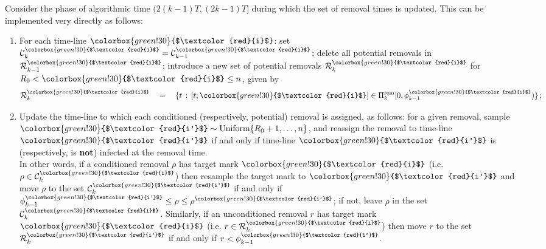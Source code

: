 \documentclass[]{article}
\newcommand{\Conditioned}{\mathcal{C}}
\newcommand{\Removals}{\mathcal{R}}
\newcommand{\Poisson}{\Pi}
\newcommand{\PoissonRem}{\Poisson^\textup{rem}}
\newcommand{\target}{{\colorbox{green!30}{$\textcolor{red}{i}$}}}
\newcommand{\targetm}{{\colorbox{green!30}{$\textcolor{red}{i'}$}}}
\begin{document}
\begin{lem}\label{lem:removal1}
Consider the phase of algorithmic time  \((2(k{-}1)T, (2k{-}1)T]\) during
which the set of removal times is updated.
This can be implemented very directly as follows:%
\begin{enumerate}
\item\label{item:removals-v2} For each time-line \(\target\): set \(\Conditioned^\target_k = \Conditioned^\target_{k-1}\);
delete all potential removals in \(\Removals^\target_{k-1}\); 
introduce a new set of potential removals \(\Removals^\target_k\) for \(R_0< \target\le n\), given by
\[
	\Removals^\target_k \quad=\quad \{t\,:\,[t;\target] \in \PoissonRem_k[0,\phi^\target_{k-1}) \} \,;
\]
\item\label{item:re-mark-removals-v2}
Update the time-line to which each conditioned (respectively, potential) removal is assigned, as follows:
for a given removal, sample \(\targetm\sim \textrm{Uniform}\{R_0+1,\dots,n\}\), 
and reassign the removal to time-line \(\targetm\) 
if and only if time-line \(\targetm\) is (respectively, is \textbf{not}) infected at the removal time. 
\\
In other words, if a conditioned removal \(\rho\) has target mark \(\target\) (i.e. \(\rho\in\Conditioned^\target_k\)) 
then resample the target mark to \(\targetm\) and
move \(\rho\) to the set \(\Conditioned^{\targetm}_k\)
if and only if \(\phi^{\targetm}_{k-1} \le \rho \le \rho^{\targetm}\); 
if not, leave \(\rho\) in the set \(\Conditioned^\target_k\). 
Similarly, if an unconditioned removal \(r\)  has target mark \(\target\) (i.e. \(r\in \Removals^\target_k\)) then move \(r\) to the set \(\Removals^{\targetm}_k\) if and only if \(r< \phi^{\targetm}_{k-1}\).%
\end{enumerate}
\end{lem}
\end{document}
